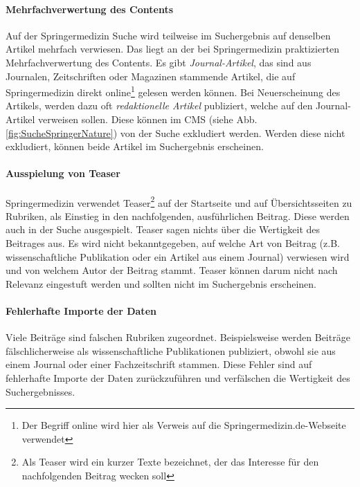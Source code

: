 \paragraph{Mehrfachverwertung des Contents}
Auf der Springermedizin Suche wird teilweise im Suchergebnis auf denselben Artikel mehrfach  verwiesen. Das liegt an der bei Springermedizin praktizierten Mehrfachverwertung des Contents. Es gibt \textit{Journal-Artikel}, das sind aus Journalen, Zeitschriften oder Magazinen stammende Artikel, die auf Springermedizin direkt online\footnote{Der Begriff \glqq online\grqq{} wird hier als Verweis auf die Springermedizin.de-Webseite verwendet} gelesen werden können. Bei Neuerscheinung des Artikels, werden dazu oft \textit{redaktionelle Artikel} publiziert, welche auf den Journal-Artikel verweisen sollen. Diese können im CMS (siehe Abb. \ref{fig:SucheSpringerNature}) von der Suche exkludiert werden. Werden diese nicht exkludiert, können beide Artikel im Suchergebnis erscheinen.

\paragraph{Ausspielung von Teaser}
Springermedizin verwendet Teaser\footnote{Als Teaser wird ein kurzer Texte bezeichnet, der das Interesse für den nachfolgenden Beitrag wecken soll} auf der Startseite und auf Übersichtsseiten zu Rubriken, als Einstieg in den nachfolgenden, ausführlichen Beitrag. Diese werden auch in der Suche ausgespielt. Teaser sagen nichts über die Wertigkeit des Beitrages aus. Es wird nicht bekanntgegeben, auf welche Art von Beitrag (z.B. wissenschaftliche Publikation oder ein Artikel aus einem Journal) verwiesen wird und von welchem Autor der Beitrag stammt. Teaser können darum nicht nach Relevanz eingestuft werden und sollten nicht im Suchergebnis erscheinen.

\paragraph{Fehlerhafte Importe der Daten}
Viele Beiträge sind falschen Rubriken zugeordnet. Beispielsweise werden Beiträge fälschlicherweise als wissenschaftliche Publikationen publiziert, obwohl sie aus einem Journal oder einer Fachzeitschrift stammen. Diese Fehler sind auf fehlerhafte Importe der Daten zurückzuführen und verfälschen die Wertigkeit des Suchergebnisses.


